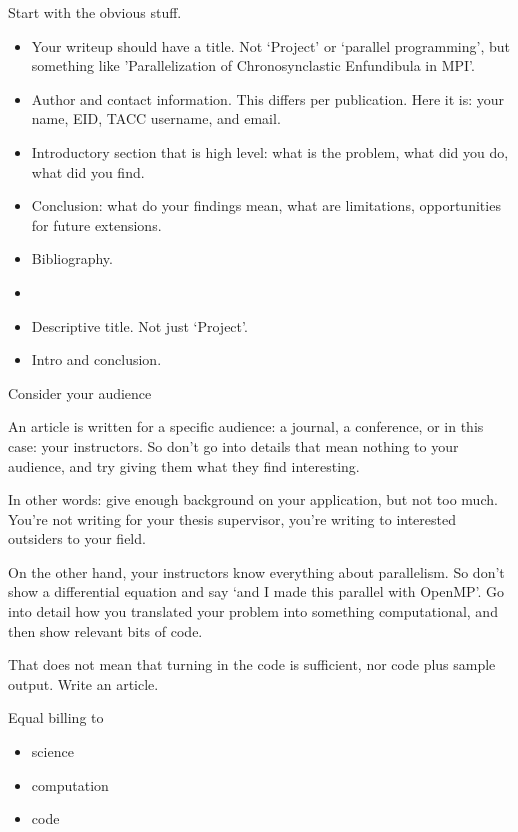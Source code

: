 Start with the obvious stuff.
\begin{itemize}
\item Your writeup should have a title. Not `Project' or `parallel programming',
  but something like 'Parallelization of Chronosynclastic Enfundibula in MPI'.
\item Author and contact information. This differs per publication.
  Here it is: your name, EID, TACC username, and email.
\item Introductory section that is high level: what is the problem,
  what did you do, what did you find.
\item Conclusion: what do your findings mean, what are limitations, opportunities
  for future extensions.
\item Bibliography.
\end{itemize}

\begin{tldr}
  \begin{itemize}
  \item
  \item Descriptive title. Not just `Project'.
  \item Intro and conclusion.
  \end{itemize}
\end{tldr}

 {Consider your audience}

An article is written for a specific audience: a journal,  a conference,
or in this case: your instructors.
So don't go into details that mean nothing to your audience, and
try giving them what they find interesting.

In other words: give enough background on your application, but not too much.
You're not writing for your thesis supervisor, you're writing to
interested outsiders to your field.

On the other hand, your instructors know everything about parallelism.
So don't show a differential equation and say `and I made this parallel with OpenMP'.
Go into detail how you translated your problem into something computational,
and then show relevant bits of code.

That does not mean that turning in the code is sufficient, nor code plus sample output.
Write an article.

\begin{tldr}
  Equal billing to 
  \begin{itemize}
  \item science
  \item computation
  \item code
  \end{itemize}
\end{tldr}

